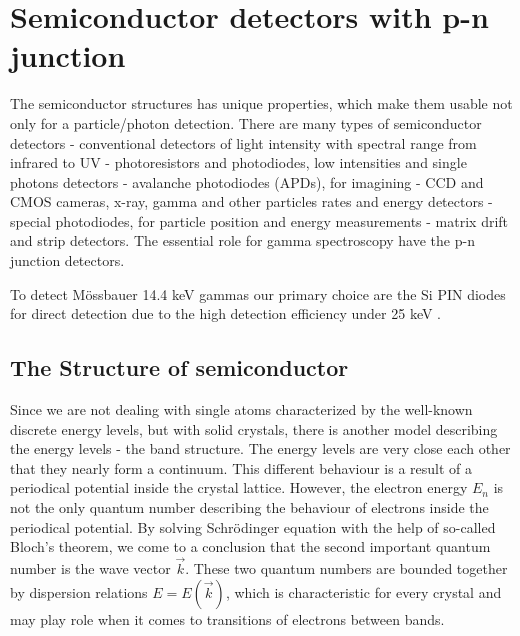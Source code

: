 
\chapter{Semiconductor detectors with p-n junction}
The semiconductor structures has unique properties, which make them usable not only for a particle/photon detection. There are many types of semiconductor detectors - conventional detectors of light intensity with spectral range from infrared to UV - photoresistors and photodiodes, low intensities and single photons detectors - avalanche photodiodes (APDs), for imagining - CCD and CMOS cameras, x-ray, gamma and other particles rates and energy detectors - special photodiodes, for particle position and energy measurements - matrix drift and strip detectors. The essential role for gamma spectroscopy have the p-n junction detectors.

\par
To detect Mössbauer 14.4 keV gammas our primary choice are the Si PIN diodes for direct detection due to the high detection efficiency under 25 keV \cite{SiCdTe}. 

\section{The Structure of semiconductor}
Since we are not dealing with single atoms characterized by the well-known discrete energy levels, but with solid crystals, there is another  model describing the energy levels - the band structure. The energy levels are very close each other that they nearly form a continuum. This different behaviour is a result of a periodical potential inside the crystal lattice. However, the electron energy $E_{n}$ is not the only quantum number describing the behaviour of electrons inside the periodical potential. By solving Schrödinger equation with the help of so-called Bloch's theorem, we come to a conclusion that the second important quantum number is the wave vector $\vec{k}$. These two quantum numbers are bounded together by dispersion relations $E = E(\vec{k})$, which is characteristic for every crystal and may play role when it comes to transitions of electrons between bands.

